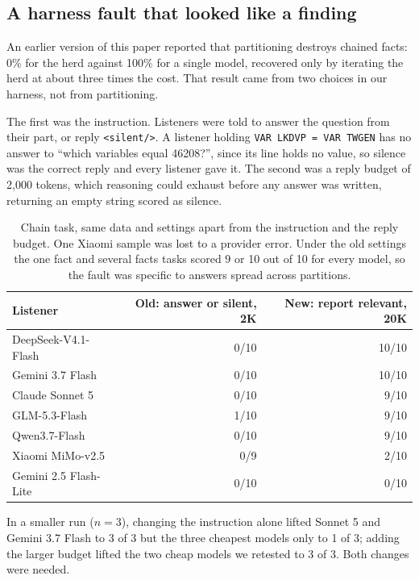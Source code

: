 \documentclass[11pt]{article}
\begin{document}
\subsection{A harness fault that looked like a finding}\label{sec:harness}

An earlier version of this paper reported that partitioning destroys chained facts:
0\% for the herd against 100\% for a single model, recovered only by iterating the
herd at about three times the cost. That result came from two choices in our harness,
not from partitioning.

The first was the instruction. Listeners were told to answer the question from their
part, or reply \texttt{<silent/>}. A listener holding \texttt{VAR LKDVP = VAR TWGEN}
has no answer to ``which variables equal 46208?'', since its line holds no value, so
silence was the correct reply and every listener gave it. The second was a reply
budget of 2{,}000 tokens, which reasoning could exhaust before any answer was written,
returning an empty string scored as silence.

\begin{table}[h]
\centering
\begin{tabular}{lrr}
\toprule
Listener & Old: answer or silent, 2K & New: report relevant, 20K \\
\midrule
DeepSeek-V4.1-Flash   & 0/10 & 10/10 \\
Gemini 3.7 Flash      & 0/10 & 10/10 \\
Claude Sonnet 5       & 0/10 &  9/10 \\
GLM-5.3-Flash         & 1/10 &  9/10 \\
Qwen3.7-Flash         & 0/10 &  9/10 \\
Xiaomi MiMo-v2.5      & 0/9  &  2/10 \\
Gemini 2.5 Flash-Lite & 0/10 &  0/10 \\
\bottomrule
\end{tabular}
\caption{Chain task, same data and settings apart from the instruction and the reply
budget. One Xiaomi sample was lost to a provider error. Under the old settings the one
fact and several facts tasks scored 9 or 10 out of 10 for every model, so the fault
was specific to answers spread across partitions.}
\end{table}

In a smaller run ($n=3$), changing the instruction alone lifted Sonnet 5 and Gemini
3.7 Flash to 3 of 3 but the three cheapest models only to 1 of 3; adding the larger
budget lifted the two cheap models we retested to 3 of 3. Both changes were needed.
\end{document}
